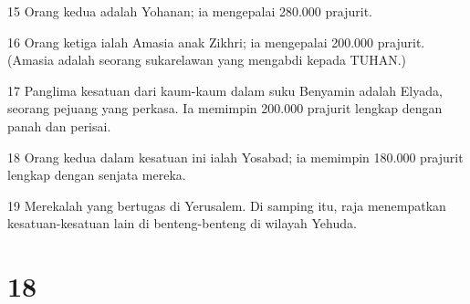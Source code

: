 \par 15 Orang kedua adalah Yohanan; ia mengepalai 280.000 prajurit.
\par 16 Orang ketiga ialah Amasia anak Zikhri; ia mengepalai 200.000 prajurit. (Amasia adalah seorang sukarelawan yang mengabdi kepada TUHAN.)
\par 17 Panglima kesatuan dari kaum-kaum dalam suku Benyamin adalah Elyada, seorang pejuang yang perkasa. Ia memimpin 200.000 prajurit lengkap dengan panah dan perisai.
\par 18 Orang kedua dalam kesatuan ini ialah Yosabad; ia memimpin 180.000 prajurit lengkap dengan senjata mereka.
\par 19 Merekalah yang bertugas di Yerusalem. Di samping itu, raja menempatkan kesatuan-kesatuan lain di benteng-benteng di wilayah Yehuda.

\chapter{18}

